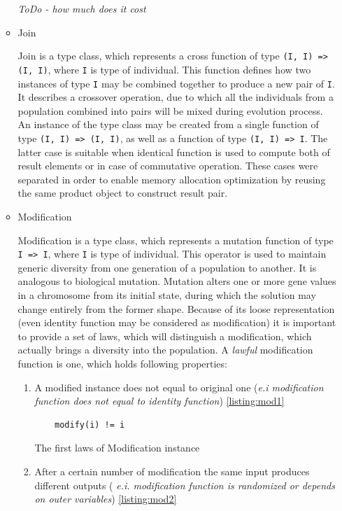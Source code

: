 \begin{itemize}
\begin{itemize}
\textit{ToDo - how much does it cost}
\medbreak

\item
Join

Join is a type class, which represents a cross function of type \texttt{(I, I) => (I, I)}, where \texttt{I} is type of individual. This function defines how two instances of type \texttt{I} may be combined together to produce a new pair of \texttt{I}. It describes a crossover operation, due to which all the individuals from a population combined into pairs will be mixed during evolution process. An instance of the type class may be created from a single function of type \texttt{(I, I) => (I, I)}, as well as a function of type \texttt{(I, I) => I}. The latter case is suitable when identical function is used to compute both of result elements or in case of commutative operation. These cases were separated in order to enable memory allocation optimization by reusing the same product object to construct result pair.
\medbreak

\item
Modification

Modification is a type class, which represents a mutation function of type \texttt{I => I}, where \texttt{I} is type of individual. This operator is used to maintain generic diversity from one generation of a population to another. It is analogous to biological mutation. Mutation alters one or more gene values in a chromosome from its initial state, during which the solution may change entirely from the former shape. Because of its loose representation (even identity function may be considered as modification) it is important to provide a set of laws, which will distinguish a modification, which actually brings a diversity into the population. A \textit{lawful} modification function is one, which holds following properties:

\begin{enumerate}
\item
A modified instance does not equal to original one (\textit{e.i modification function does not equal to identity function}) \ref{listing:mod1}

\begin{listing}
\begin{verbatim}
	modify(i) != i
\end{verbatim}
\caption{The first laws of Modification instance} \label{listing:mod1}
\end{listing}

\item
After a certain number of modification the same input produces different outputs (\textit{ e.i. modification function is randomized or depends on outer variables}) \ref{listing:mod2}


\end{enumerate}
\end{itemize}
\end{itemize}
